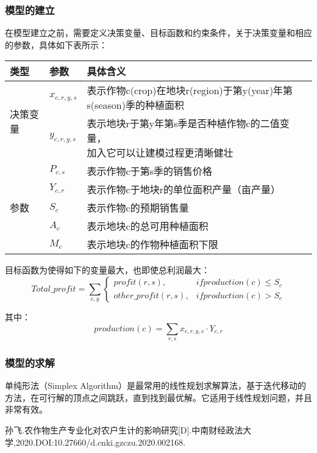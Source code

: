 \documentclass{cumcmthesis}
\begin{document}
\subsubsection{模型的建立}
在模型建立之前，需要定义决策变量、目标函数和约束条件，关于决策变量和相应的参数，具体如下表所示：
\begin{table}[ht]
    \centering
    \begin{tabular}{|l|l|l|}
        \hline
        类型 & 参数 & 具体含义 \\ \hline
        \multirow{2}{*}{决策变量} & $x_{c,r,y,s}$ & 表示作物c(crop)在地块r(region)于第y(year)年第s(season)季的种植面积 \\ \cline{2-3}
        ~ & $y_{c,r,y,s}$ & \makecell{表示地块r于第y年第s季是否种植作物c的二值变量，\\加入它可以让建模过程更清晰健壮} \\ \hline
        \multirow{5}{*}{\centering 参数} & $P_{c,s}$ & 表示作物c于第s季的销售价格 \\ \cline{2-3}
        ~ & $Y_{c,r}$ & 表示作物c于地块r的单位面积产量（亩产量） \\ \cline{2-3}
        ~ & $S_{c}$ & 表示作物c的预期销售量 \\ \cline{2-3}
        ~ & $A_c$ & 表示地块c的总可用种植面积 \\ \cline{2-3}
        ~ & $M_c$ & 表示地块c的作物种植面积下限 \\ \hline
    \end{tabular}
\end{table}

目标函数为使得如下的变量最大，也即使总利润最大：\newline
\begin{equation}
    Total\_profit = \sum_{c, y} \begin{cases} 
    profit(r, s), & if production(c) \leq S_c \\
    other\_profit(r, s), & if production(c) > S_c
    \end{cases}
\end{equation}

其中：
\begin{equation}
    production(c) = \sum_{r, s} x_{c,r,y,s} \cdot Y_{c,r}
\end{equation}

\subsubsection{模型的求解}
单纯形法（Simplex Algorithm）是最常用的线性规划求解算法，基于迭代移动的方法，在可行解的顶点之间跳跃，直到找到最优解。它适用于线性规划问题，并且非常有效。



\begin{thebibliography}{99}  
     孙飞.农作物生产专业化对农户生计的影响研究[D].中南财经政法大学,2020.DOI:10.27660/d.cnki.gzczu.2020.002168.

    \end{thebibliography}
    
\end{document}
